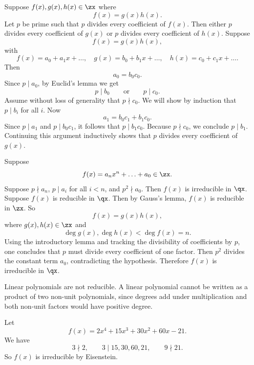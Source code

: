 \begin{lemma}{
    Suppose $f(x),g(x),h(x)\in\zx$ where
    \[
        f(x)=g(x)h(x).
    \]
    Let $p$ be prime such that $p$ divides every coefficient of $f(x)$.
    Then either $p$ divides every coefficient of $g(x)$ or $p$ divides every coefficient of $h(x)$.
}
    Suppose
    \[
        f(x)=g(x)h(x),
    \]
    with
    \[
        f(x)=a_0+a_{1}x+\hdots,\quad g(x)=b_0+b_{1}x+\hdots,\quad h(x)=c_0+c_{1}x+\hdots.
    \]
    Then
    \[
        a_0=b_{0}c_0.
    \]
    Since $p\mid a_0$, by Euclid's lemma we get
    \[
        p\mid b_0
        \qquad\text{or}\qquad
        p\mid c_0.
    \]
    Assume without loss of generality that $p\nmid c_0$.
    We will show by induction that $p\mid b_i$ for all $i$.
    Now
    \[
        a_1=b_{0}c_1+b_{1}c_0.
    \]
    Since $p\mid a_1$ and $p\mid b_{0}c_1$, it follows that $p\mid b_{1}c_0$.
    Because $p\nmid c_0$, we conclude $p\mid b_1$.
    Continuing this argument inductively shows that $p$ divides every coefficient of $g(x)$.
\end{lemma}

\begin{theorem}{
    Suppose
    \[
        f(x)=a_{n}x^n+\hdots+a_0\in\zx.
    \]
    Suppose $p\nmid a_n$, $p\mid a_i$ for all $i<n$, and $p^2\nmid a_0$.
    Then $f(x)$ is irreducible in $\qx$.
}
Suppose $f(x)$ is reducible in $\qx$.
Then by Gauss's lemma, $f(x)$ is reducible in $\zx$.
So
\[
    f(x)=g(x)h(x),
\]
where $g(x),h(x)\in\zx$ and
\[
    \deg g(x),\deg h(x)<\deg f(x)=n.
\]
Using the introductory lemma and tracking the divisibility of coefficients by $p$, one concludes that $p$ must divide every coefficient of one factor.
Then $p^2$ divides the constant term $a_0$, contradicting the hypothesis.
Therefore $f(x)$ is irreducible in $\qx$.
\end{theorem}

\begin{lemma}{
    Linear polynomials are not reducible.
}
    A linear polynomial cannot be written as a product of two non-unit polynomials, since degrees add under multiplication and both non-unit factors would have positive degree.
\end{lemma}

Let
\[
    f(x)=2x^4+15x^3+30x^2+60x-21.
\]
We have
\[
    3\nmid 2,\qquad 3\mid 15,30,60,21,\qquad 9\nmid 21.
\]
So $f(x)$ is irreducible by Eisenstein.

